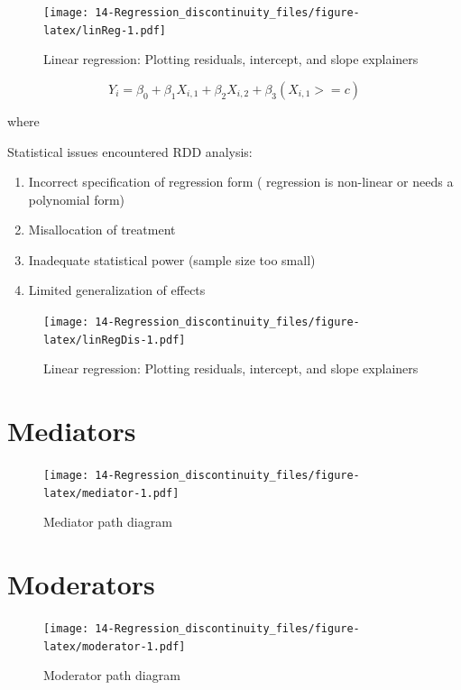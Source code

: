 \documentclass[]{book}
\providecommand{\tightlist}{%
  \setlength{\itemsep}{0pt}\setlength{\parskip}{0pt}}
\begin{document}
\begin{figure}
\centering
\texttt{[image: 14-Regression\_discontinuity\_files/figure-latex/linReg-1.pdf]}
\caption{\label{fig:linReg}Linear regression: Plotting residuals, intercept, and slope explainers}
\end{figure}

\[Y_{i} = \beta_{0} +  \beta_{1}X_{i,1} + \beta_{2}X_{i,2} + \beta_{3}(X_{i,1} >= c) \]

where

Statistical issues encountered RDD analysis:

\begin{enumerate}
\def\labelenumi{\arabic{enumi}.}
\tightlist
\item
  Incorrect specification of regression form ( regression is non-linear or needs a polynomial form)
\item
  Misallocation of treatment
\item
  Inadequate statistical power (sample size too small)
\item
  Limited generalization of effects
\end{enumerate}

\begin{figure}
\centering
\texttt{[image: 14-Regression\_discontinuity\_files/figure-latex/linRegDis-1.pdf]}
\caption{\label{fig:linRegDis}Linear regression: Plotting residuals, intercept, and slope explainers}
\end{figure}

\hypertarget{mediators}{%
\section{Mediators}\label{mediators}}

\begin{figure}
\centering
\texttt{[image: 14-Regression\_discontinuity\_files/figure-latex/mediator-1.pdf]}
\caption{\label{fig:mediator}Mediator path diagram}
\end{figure}

\hypertarget{moderators}{%
\section{Moderators}\label{moderators}}

\begin{figure}
\centering
\texttt{[image: 14-Regression\_discontinuity\_files/figure-latex/moderator-1.pdf]}
\caption{\label{fig:moderator}Moderator path diagram}
\end{figure}
\end{document}

